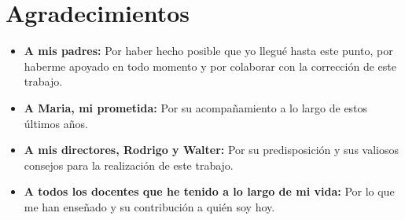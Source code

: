 \chapter*{Agradecimientos}

\begin{itemize}
    \item \textbf{A mis padres:} Por haber hecho posible que yo llegué hasta este punto, por haberme apoyado en todo momento y por colaborar con la corrección de este trabajo.
    \item \textbf{A Maria, mi prometida:} Por su acompañamiento a lo largo de estos últimos años.
    \item \textbf{A mis directores, Rodrigo y Walter:} Por su predisposición y sus valiosos consejos para la realización de este trabajo.
    \item \textbf{A todos los docentes que he tenido a lo largo de mi vida:} Por lo que me han enseñado y su contribución a quién soy hoy.
\end{itemize}
